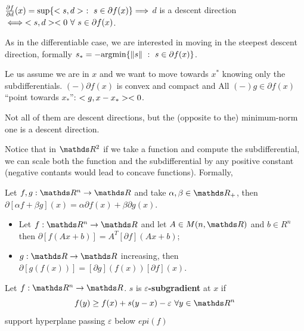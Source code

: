 \documentclass[computationalMathematics.tex]{subfiles}
\begin{document}
\begin{proposition}
$\frac{\partial f}{\partial d}(x) = \sup \{<s, d>~:~s \in \partial f(x)\} \Longrightarrow$ $d$ is a descent direction  $\iff <s, d> < 0~\forall~s \in \partial f(x)$.
\end{proposition}

As in the differentiable case, we are interested in moving in the steepest descent direction, formally $s_* = - \mbox{argmin} \{\left\lVert s\right\rVert~:~s \in \partial f(x)\}$.

\begin{example}
Le us assume we are in $x$ and we want to move towards $x^*$ knowing only the subdifferentials.
$(-)\partial f(x)$ is convex and compact and All $(-)g \in \partial f(x)$ ``point towards $x_*$'': $<g, x - x_*> < 0$.

Not all of them are descent directions, but the (opposite to the) minimum-norm one is a descent direction.

\end{example}

Notice that in $\R^2$ if we take a function and compute the subdifferential, we can scale both the function and the subdifferential by any positive constant (negative contants would lead to concave functions). Formally,

\begin{proposition}
Let $f,g: \R^n \to \R$ and take $\alpha, \beta \in \R_+$, then $\partial [\alpha f + \beta g](x) = \alpha \partial f(x) + \beta \partial g(x)$.
\end{proposition}

\begin{proposition}
  \begin{itemize}
    \item Let $f: \R^n \to \R$ and let $A \in M(n, \R)$ and $b \in R^n$ then $\partial [f(Ax + b)] = A^T [\partial f](Ax + b) $;
    \item $g:\R \to \R$ increasing, then $\partial [g(f(x))] = [\partial g](f(x)) [\partial f](x)$.
  \end{itemize}
\end{proposition}

\begin{definition}
  Let $f: \R^n \to \R$. $s$ is $\varepsilon$\textbf{-subgradient} at $x$ if 
\[
  f(y) \geq f(x) + s (y - x) - \varepsilon~ \forall y \in \R^n
\]
support hyperplane passing $\varepsilon$ below $epi(f)$
\end{definition}
\end{document}

